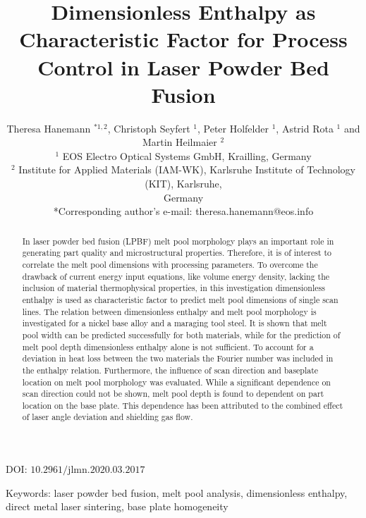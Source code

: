 \documentclass[10pt]{article}
\title{Dimensionless Enthalpy as Characteristic Factor for Process Control in Laser Powder Bed Fusion }
\author{Theresa Hanemann ${ }^{* 1,2}$, Christoph Seyfert ${ }^{1}$, Peter Holfelder ${ }^{1}$, Astrid Rota $^{1}$ and Martin Heilmaier ${ }^{2}$\\
${ }^{1}$ EOS Electro Optical Systems GmbH, Krailling, Germany\\
${ }^{2}$ Institute for Applied Materials (IAM-WK), Karlsruhe Institute of Technology (KIT), Karlsruhe,\\
Germany\\
*Corresponding author's e-mail: theresa.hanemann@eos.info}
\date{}
\begin{document}
\maketitle


\begin{abstract}
In laser powder bed fusion (LPBF) melt pool morphology plays an important role in generating part quality and microstructural properties. Therefore, it is of interest to correlate the melt pool dimensions with processing parameters. To overcome the drawback of current energy input equations, like volume energy density, lacking the inclusion of material thermophysical properties, in this investigation dimensionless enthalpy is used as characteristic factor to predict melt pool dimensions of single scan lines. The relation between dimensionless enthalpy and melt pool morphology is investigated for a nickel base alloy and a maraging tool steel. It is shown that melt pool width can be predicted successfully for both materials, while for the prediction of melt pool depth dimensionless enthalpy alone is not sufficient. To account for a deviation in heat loss between the two materials the Fourier number was included in the enthalpy relation. Furthermore, the influence of scan direction and baseplate location on melt pool morphology was evaluated. While a significant dependence on scan direction could not be shown, melt pool depth is found to dependent on part location on the base plate. This dependence has been attributed to the combined effect of laser angle deviation and shielding gas flow.
\end{abstract}

DOI: $10.2961 / \mathrm{jlmn} .2020 .03 .2017$

Keywords: laser powder bed fusion, melt pool analysis, dimensionless enthalpy, direct metal laser sintering, base plate homogeneity
\end{document}
